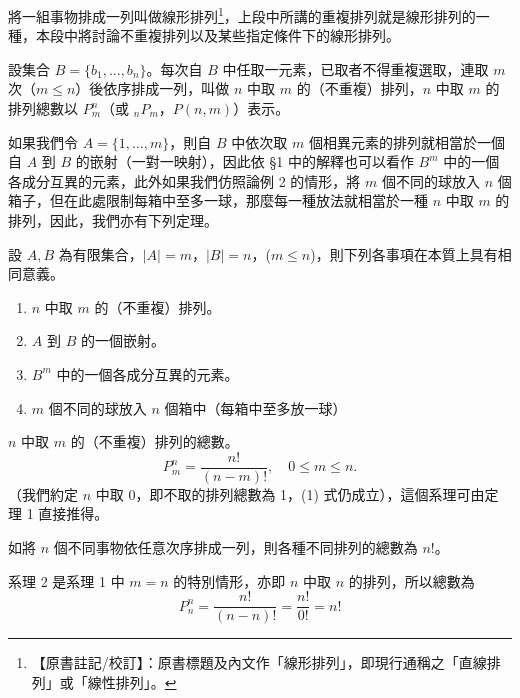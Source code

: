 將一組事物排成一列叫做線形排列\label{note:b5s-ch2-linear-perm}\footnote{【原書註記/校訂】：原書標題及內文作「線形排列」，即現行通稱之「直線排列」或「線性排列」。}，上段中所講的重複排列就是線形排列的一種，本段中將討論不重複排列以及某些指定條件下的線形排列。

\begin{definition*}
設集合 $B=\{b_1, \dots, b_n\}$。每次自 $B$ 中任取一元素，已取者不得重複選取，連取 $m$ 次（$m \le n$）後依序排成一列，叫做 $n$ 中取 $m$ 的（不重複）排列，$n$ 中取 $m$ 的排列總數以 $P_m^n$（或 $_n P_m$，$P(n,m)$）表示。
\end{definition*}

如果我們令 $A=\{1, \dots, m\}$，則自 $B$ 中依次取 $m$ 個相異元素的排列就相當於一個自 $A$ 到 $B$ 的嵌射（一對一映射），因此依 \S 1 中的解釋也可以看作 $B^m$ 中的一個各成分互異的元素，此外如果我們仿照論例 2 的情形，將 $m$ 個不同的球放入 $n$ 個箱子，但在此處限制每箱中至多一球，那麼每一種放法就相當於一種 $n$ 中取 $m$ 的排列，因此，我們亦有下列定理。

\begin{theorem}\label{thm:b5s-2-5}
設 $A, B$ 為有限集合，$|A|=m$，$|B|=n$，($m \le n$)，則下列各事項在本質上具有相同意義。
\begin{enumerate}[label=\Roman*., itemsep=2pt, topsep=2pt]
  \item $n$ 中取 $m$ 的（不重複）排列。
  \item $A$ 到 $B$ 的一個嵌射。
  \item $B^m$ 中的一個各成分互異的元素。
  \item $m$ 個不同的球放入 $n$ 個箱中（每箱中至多放一球）
\end{enumerate}
\end{theorem}

\begin{corollary}\label{cor:b5s-2-1}
$n$ 中取 $m$ 的（不重複）排列的總數。
\begin{equation}
P_m^n = \frac{n!}{(n-m)!}, \quad 0 \le m \le n.
\end{equation}
（我們約定 $n$ 中取 0，即不取的排列總數為 1，(1) 式仍成立），這個系理可由定理 1 直接推得。
\end{corollary}

\begin{corollary}\label{cor:b5s-2-2}
如將 $n$ 個不同事物依任意次序排成一列，則各種不同排列的總數為 $n!$。
\end{corollary}

\indent 系理 2 是系理 1 中 $m=n$ 的特別情形，亦即 $n$ 中取 $n$ 的排列，所以總數為
\[
P_n^n = \frac{n!}{(n-n)!} = \frac{n!}{0!} = n!
\]

